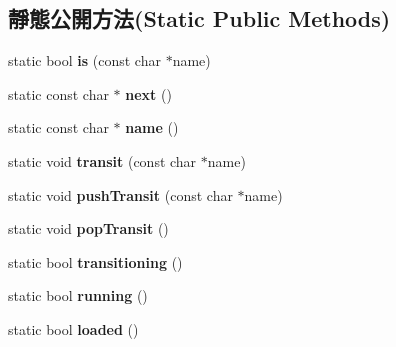 \subsection*{靜態公開方法(Static Public Methods)}
\begin{DoxyCompactItemize}
\item 
static bool {\bfseries is} (const char $\ast$name)\hypertarget{class_magnum_1_1_scene_abba8220ceeba7f7c538d41790fdba5a2}{}\label{class_magnum_1_1_scene_abba8220ceeba7f7c538d41790fdba5a2}

\item 
static const char $\ast$ {\bfseries next} ()\hypertarget{class_magnum_1_1_scene_aa17bd125efa10de89ebc2347671266f4}{}\label{class_magnum_1_1_scene_aa17bd125efa10de89ebc2347671266f4}

\item 
static const char $\ast$ {\bfseries name} ()\hypertarget{class_magnum_1_1_scene_a975521adb8286d36f13e057be12fc82c}{}\label{class_magnum_1_1_scene_a975521adb8286d36f13e057be12fc82c}

\item 
static void {\bfseries transit} (const char $\ast$name)\hypertarget{class_magnum_1_1_scene_aee8cb98ffd2787777af844a0aeff79f9}{}\label{class_magnum_1_1_scene_aee8cb98ffd2787777af844a0aeff79f9}

\item 
static void {\bfseries push\+Transit} (const char $\ast$name)\hypertarget{class_magnum_1_1_scene_a0b83fc266a2403c20ee666debc19a195}{}\label{class_magnum_1_1_scene_a0b83fc266a2403c20ee666debc19a195}

\item 
static void {\bfseries pop\+Transit} ()\hypertarget{class_magnum_1_1_scene_aee63f3ffbca6fbbec69612ba5ebbc48a}{}\label{class_magnum_1_1_scene_aee63f3ffbca6fbbec69612ba5ebbc48a}

\item 
static bool {\bfseries transitioning} ()\hypertarget{class_magnum_1_1_scene_a75d802e3bb17fe1d3323a296e0b4ef2f}{}\label{class_magnum_1_1_scene_a75d802e3bb17fe1d3323a296e0b4ef2f}

\item 
static bool {\bfseries running} ()\hypertarget{class_magnum_1_1_scene_a3ad03236a6b2d2b5257b57f9d94eb849}{}\label{class_magnum_1_1_scene_a3ad03236a6b2d2b5257b57f9d94eb849}

\item 
static bool {\bfseries loaded} ()\hypertarget{class_magnum_1_1_scene_add6836105b3b0846010632b831b3114a}{}\label{class_magnum_1_1_scene_add6836105b3b0846010632b831b3114a}

\end{DoxyCompactItemize}
